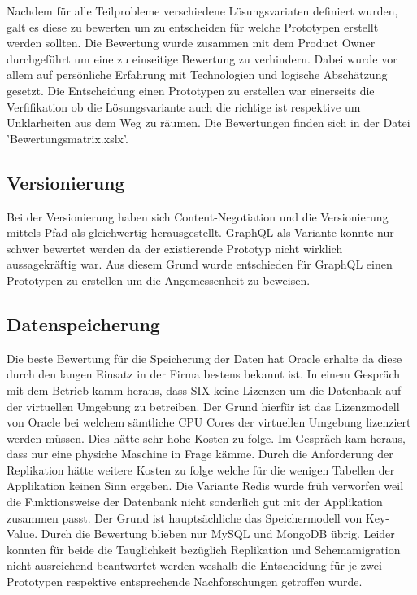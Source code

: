 Nachdem für alle Teilprobleme verschiedene Lösungsvariaten definiert wurden, galt es diese zu bewerten um zu entscheiden für welche Prototypen erstellt werden sollten. Die Bewertung wurde zusammen mit dem Product Owner durchgeführt um eine zu einseitige Bewertung zu verhindern. Dabei wurde vor allem auf persönliche Erfahrung mit Technologien und logische Abschätzung gesetzt. Die Entscheidung einen Prototypen zu erstellen war einerseits die Verfifikation ob die Lösungsvariante auch die richtige ist respektive um Unklarheiten aus dem Weg zu räumen. Die Bewertungen finden sich in der Datei 'Bewertungsmatrix.xslx'. 

\subsection{Versionierung}

Bei der Versionierung haben sich Content-Negotiation und die Versionierung mittels Pfad als gleichwertig herausgestellt. GraphQL als Variante konnte nur schwer bewertet werden da der existierende Prototyp nicht wirklich aussagekräftig war. Aus diesem Grund wurde entschieden für GraphQL einen Prototypen zu erstellen um die Angemessenheit zu beweisen.

\subsection{Datenspeicherung}

Die beste Bewertung für die Speicherung der Daten hat Oracle erhalte da diese durch den langen Einsatz in der Firma bestens bekannt ist. In einem Gespräch mit dem Betrieb kamm heraus, dass SIX keine Lizenzen um die Datenbank auf der virtuellen Umgebung zu betreiben. Der Grund hierfür ist das Lizenzmodell von Oracle bei welchem sämtliche CPU Cores der virtuellen Umgebung lizenziert werden müssen. Dies hätte sehr hohe Kosten zu folge. Im Gespräch kam heraus, dass nur eine physiche Maschine in Frage kämme. 
Durch die Anforderung der Replikation hätte weitere Kosten zu folge welche für die wenigen Tabellen der Applikation keinen Sinn ergeben.
Die Variante Redis wurde früh verworfen weil die Funktionsweise der Datenbank nicht sonderlich gut mit der Applikation zusammen passt. Der Grund ist hauptsächliche das Speichermodell von Key-Value.
Durch die Bewertung blieben nur MySQL und MongoDB übrig. Leider konnten für beide die Tauglichkeit bezüglich Replikation und Schemamigration nicht ausreichend beantwortet werden weshalb die Entscheidung für je zwei Prototypen respektive entsprechende Nachforschungen getroffen wurde.

